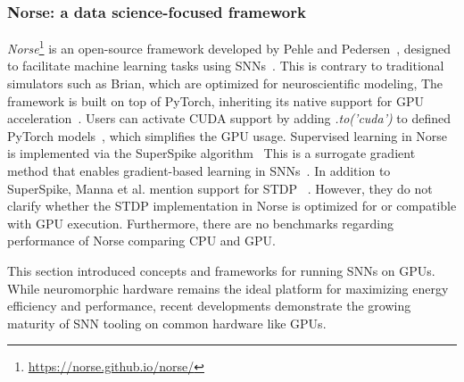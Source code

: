 \subsubsection{Norse: a data science-focused framework}
\textit{Norse}\footnote{\url{https://norse.github.io/norse/}} is an open-source framework developed by Pehle and Pedersen~\cite{norse2021}, designed to facilitate machine learning tasks using \acp{SNN}~\cite{manna_frameworks_2023}.  
This is contrary to  traditional simulators such as Brian, which are optimized for neuroscientific modeling,
The framework is built on top of PyTorch, inheriting its native support for \ac{GPU} acceleration~\cite{manna_frameworks_2023, garcia-vico_preliminary_2021}.  
Users can activate CUDA support by adding \textit{.to('cuda')} to defined PyTorch models~\cite{norse2021}, which simplifies the \ac{GPU} usage.
Supervised learning in Norse is implemented via the SuperSpike algorithm~\cite{manna_frameworks_2023, garcia-vico_preliminary_2021}
This is a surrogate gradient method that enables gradient-based learning in \acp{SNN}~\cite{zenke_superspike_2018}.  
In addition to SuperSpike, Manna et al. mention support for \ac{STDP} ~\cite{manna_frameworks_2023}.
However, they do not clarify whether the \ac{STDP} implementation in Norse is optimized for or compatible with \ac{GPU} execution.  
Furthermore, there are no benchmarks regarding performance of Norse comparing \ac{CPU} and \ac{GPU}.

This section introduced concepts and frameworks for running \acp{SNN} on \acp{GPU}.
While neuromorphic hardware remains the ideal platform for maximizing energy efficiency and performance, recent developments demonstrate the growing maturity of \ac{SNN} tooling on common hardware like \acp{GPU}.